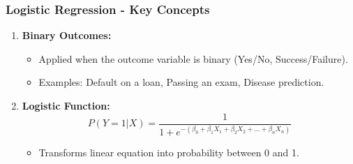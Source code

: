 \documentclass{beamer}
\begin{document}
\begin{frame}[fragile]
    \frametitle{Logistic Regression - Key Concepts}
    \begin{enumerate}
        \item \textbf{Binary Outcomes:}
        \begin{itemize}
            \item Applied when the outcome variable is binary (Yes/No, Success/Failure).
            \item Examples: Default on a loan, Passing an exam, Disease prediction.
        \end{itemize}
        
        \item \textbf{Logistic Function:}
        \begin{equation}
            P(Y=1 | X) = \frac{1}{1 + e^{-(\beta_0 + \beta_1X_1 + \beta_2X_2 + ... + \beta_nX_n)}}
        \end{equation}
        \begin{itemize}
            \item Transforms linear equation into probability between 0 and 1.
        \end{itemize}
    \end{enumerate}
\end{frame}
\end{document}
